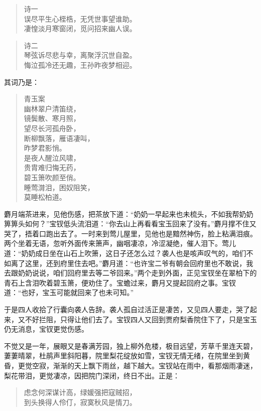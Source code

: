 \documentclass[12pt,oneside]{book}
\newenvironment{shici}{%
\begin{verse}%
\centering\large\hspace{12pt}}%
{\end{verse}}
\begin{document}
\begin{shici}
诗一 \\
误尽平生心桎梏，无凭世事望谁助。\\
凄惶淡月寒窗闭，觅问招来幽人误。 
\end{shici}

\begin{shici}
诗二 \\
琴弦诉尽悲与幸，离聚浮沉世自盈。\\
悔泣孤冷还无趣，王孙昨夜梦相迎。 
\end{shici}

其词乃是： 

\begin{shici}
青玉案 \\
幽林翠户清笛绕，\\
镜鬓散、寒月照，\\
望尽长河孤舟卧，\\
断柳飘落，雁语凄叫，\\
昨梦君影悄。\\
是夜人醒泣风啸，\\
贵胄难归悔无药，\\
碧玉箫吹颜至俏。\\
睡莺潸泪，困奴阻笑，\\
莫睡松柏道。
\end{shici}


麝月端茶进来，见他伤感，把茶放下道：“奶奶一早起来也未梳头，不如我帮奶奶箅箅头如何？”宝钗低头流泪道：“你去山上再看看宝玉回来了没有。”麝月撑不住又哭了，捂着口跑出去了。一时来到莺儿屋里，见他也是黯然神伤，脸上粘满泪痕。两个坐着无语，忽听外面传来箫声，幽咽凄凉，冷涩凝绝，催人泪下。莺儿道：“奶奶成日坐在山石上吹箫，这日子还怎么过？袭人也是咳声叹气的，咱们不如离了这里，还到府里住去吧。”麝月道：“也许宝二爷有朝会回府里也不敢说，我去跟奶奶说说，咱们回府里去等二爷回来。”两个走到外面，正见宝钗坐在翠柏下的青石上含泪吹着碧玉箫，便劝住了。宝蟾过来，麝月又提起回府之事。宝钗道：“也好，宝玉可能就回来了也未可知。”

于是四人收拾了行囊向袭人告辞。袭人孤自过活正是凄苦，又见四人要走，哭了起来，又不好拦阻，只得让他们去了。宝钗四人又回到贾府梨香院住下了，只是宝玉仍无消息，宝钗更觉伤感。

不觉又是一年，展眼又是春满芳园，独上柳外危楼，极目远望，芳草千里连天碧，萋萋晴翠，杜鹃声里斜阳暮，院里梨花绽放如雪，宝钗无情无绪，在院里坐到黄昏，更觉空寂，渐渐的天上飘下雨丝，越下越大。宝钗站在雨中，看那烟雨凄迷，梨花带泪，更觉凄凉，因把院门深闭，终日不出。正是：

\begin{shici}
虑念何深谋计高，绿媛强把寇贼招，\\
到头换得人伶仃，寂寞秋风是情刀。
\end{shici}
\end{document}
